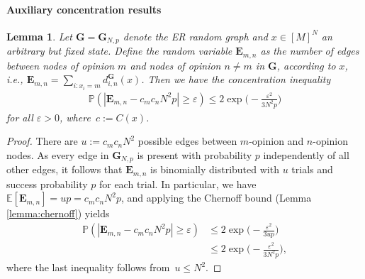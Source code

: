 \documentclass[a4paper,
               10pt,
               pdftex,
               normalheadings,
               headsepline,
               footsepline,
               headinclude,
               footinclude,
               DIV=14,
               abstracton]
{scrartcl}
\newtheorem{lemma}[theorem]{Lemma}
\newcommand{\rv}[1]{\bm{#1}}
\begin{document}
\paragraph{Auxiliary concentration results}

\begin{lemma} \label{lemma:ER_counts}
Let $\rv{G} = \rv{G}_{N,p}$ denote the ER random graph and $x \in [M]^N$ an arbitrary but fixed state. Define the random variable $\rv{E}_{m,n}$ as the number of edges between nodes of opinion $m$ and nodes of opinion $n\neq m$ in $\rv{G}$, according to $x$, i.e., $\rv{E}_{m,n} = \sum_{i:x_i=m} d_{i,n}^{\rv{G}}(x)$.
Then we have the concentration inequality
\begin{align}
    \mathbb{P}(|\rv{E}_{m,n} - c_m c_n N^2 p | \geq \varepsilon) \leq 2 \exp\Big(-\frac{ \varepsilon^2}{3 N^2 p}\Big)
\end{align}
for all $\varepsilon>0$, where~$c := C(x)$.
\end{lemma}
\begin{proof}
    There are $u := c_m c_n N^2$ possible edges between $m$-opinion and $n$-opinion nodes. As every edge in $\rv{G}_{N,p}$ is present with probability $p$ independently of all other edges, it follows that $\rv{E}_{m,n}$ is binomially distributed with $u$ trials and success probability $p$ for each trial.
    In particular, we have $\mathbb{E}[\rv{E}_{m,n}] = u p = c_m c_n N^2 p$, and applying the Chernoff bound (Lemma \ref{lemma:chernoff}) yields
    \begin{align}
    \mathbb{P}(|\rv{E}_{m,n} - c_m c_n N^2 p | \geq \varepsilon) &\leq 2 \exp\Big(- \frac{\varepsilon^2}{3 u p}\Big) \\
    &\leq 2 \exp\Big(-\frac{ \varepsilon^2}{3 N^2 p}\Big),
    \end{align}
    where the last inequality follows from~$u \leq N^2$.
\end{proof}
\end{document}
